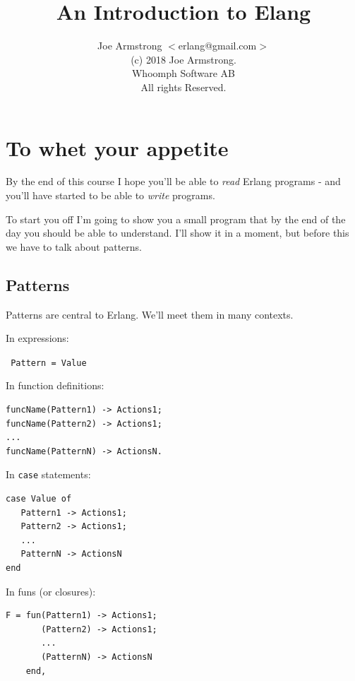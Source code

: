 \documentclass[12pt]{article}
\begin{document}
\title{An Introduction to Elang}

\author{Joe Armstrong $<$erlang@gmail.com$>$\\
(c) 2018 Joe Armstrong.\\
 Whoomph Software AB \\
  All rights Reserved.}


 \maketitle
 
 \tableofcontents

\section{To whet your appetite}

By the end of this course I hope you'll be able to {\sl read} Erlang
programs - and you'll have started to be able to {\sl write} programs.

To start you off I'm going to show you a small program that by the
end of the day you should be able to understand. I'll show it in
a moment, but before this we have to talk about patterns.

\subsection{Patterns}

Patterns are central to Erlang. We'll meet them in many contexts.

In expressions:

\verb+ Pattern = Value+

In function definitions:

\begin{verbatim}
funcName(Pattern1) -> Actions1;
funcName(Pattern2) -> Actions1;
...
funcName(PatternN) -> ActionsN.
\end{verbatim}

In \verb+case+ statements:

\begin{verbatim}
case Value of
   Pattern1 -> Actions1;
   Pattern2 -> Actions1;
   ...
   PatternN -> ActionsN
end
\end{verbatim}

In funs (or closures):

\begin{verbatim}
F = fun(Pattern1) -> Actions1;
       (Pattern2) -> Actions1;
       ...
       (PatternN) -> ActionsN
    end,
\end{verbatim}
\end{document}
